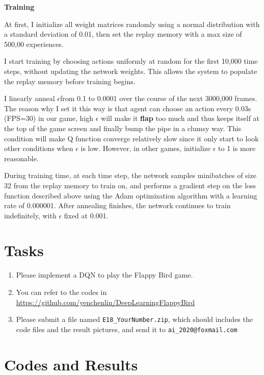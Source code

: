 \documentclass[a4paper, 11pt]{article}
\begin{document}
\textbf{Training}

At first, I initialize all weight matrices randomly using a normal distribution with a standard deviation of 0.01, then set the replay memory with a max size of 500,00 experiences.

I start training by choosing actions uniformly at random for the first 10,000 time steps, without updating the network weights. This allows the
system to populate the replay memory before training begins.

I linearly anneal $\epsilon$from 0.1 to 0.0001 over the course of the next 3000,000 frames. The reason why I set it this way is that agent can choose an action every 0.03s (FPS=30) in our game, high $\epsilon$ will make it \textbf{flap} too much and thus keeps itself at the top of the game screen and finally bump the pipe in a clumsy way. This condition will make Q function converge relatively slow since it only start to look other conditions when $\epsilon$ is low. However, in other games, initialize $\epsilon$ to 1 is more reasonable.

During training time, at each time step, the network samples minibatches of size 32 from the replay memory to train on, and performs a gradient step on the loss function described above using the Adam optimization
algorithm with a learning rate of 0.000001. After annealing finishes, the network continues to train indefinitely, with $\epsilon$ fixed at 0.001.

\section{Tasks}
\begin{enumerate}
	\item Please implement a DQN to play the Flappy Bird game.
	\item You can refer to the codes in \url{https://github.com/yenchenlin/DeepLearningFlappyBird}
	\item Please submit a file named \texttt{E18\_YourNumber.zip}, which should includes the code files and the result pictures, and send it to \texttt{ai\_2020@foxmail.com}
\end{enumerate}
\section{Codes and Results}
\end{document}
